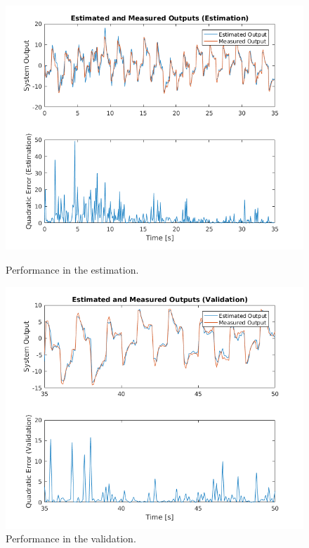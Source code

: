 \documentclass[12pt]{article}
\begin{document}
\begin{figure}[H]
	\centering
	\begin{minipage}{.5\textwidth}
		\centering
		\includegraphics[keepaspectratio=true, scale=0.35]{images/armax_performance_estimation.png}
		\caption{Performance in the estimation.}
		\label{armax_performance_estimation}
	\end{minipage}%
	\begin{minipage}{.5\textwidth}
		\centering
		\includegraphics[keepaspectratio=true, scale=0.35]{images/armax_performance_validation.png}
		\caption{Performance in the validation.}
		\label{armax_performance_validation}
	\end{minipage}
\end{figure}
\end{document}
